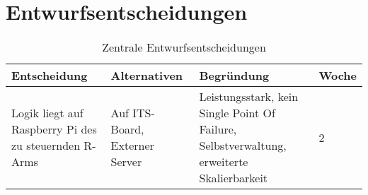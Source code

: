 \chapter{Entwurfsentscheidungen}



\begin{table}[h!]
	\centering
	\begin{tabular}{p{3cm}|p{4cm}| p{5.5cm} | p{1.5cm}|}
		\hline
		\textbf{Entscheidung} & \textbf{Alternativen} & \textbf{Begründung} & \textbf{Woche}\\
		\hline
		Logik liegt auf Raspberry Pi des zu steuernden R-Arms& Auf ITS-Board, Externer Server & Leistungsstark, kein Single Point Of Failure, Selbstverwaltung, erweiterte Skalierbarkeit & 2 \\
		 
		\hline
	\end{tabular}
	\caption{Zentrale Entwurfsentscheidungen}
	\label{tab:entwurfsentschiedungen}
\end{table}
